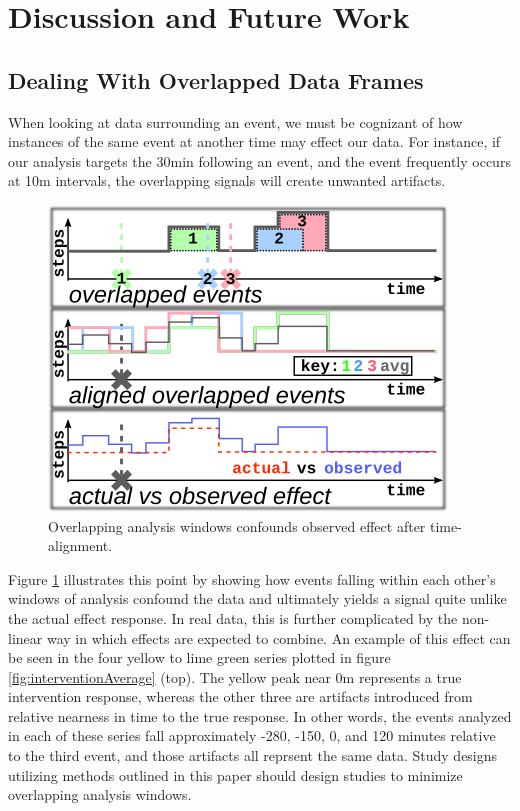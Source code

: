 \section{Discussion and Future Work}

\subsection{Dealing With Overlapped Data Frames}
When looking at data surrounding an event, we must be cognizant of how instances of the same event at another time may effect our data.
For instance, if our analysis targets the 30min following an event, and the event frequently occurs at 10m intervals, the overlapping signals will create unwanted artifacts.

\begin{figure}
\centering
\includegraphics[width=0.6\columnwidth]{./img/eventOverlapExample.png}
\caption{Overlapping analysis windows confounds observed effect after time-alignment.}
\label{fig:overlapExample}
\end{figure}

Figure \ref{fig:overlapExample} illustrates this point by showing how events falling within each other's windows of analysis confound the data and ultimately yields a signal quite unlike the actual effect response.
In real data, this is further complicated by the non-linear way in which effects are expected to combine.
An example of this effect can be seen in the four yellow to lime green series plotted in figure \ref{fig:interventionAverage} (top).
The yellow peak near 0m represents a true intervention response, whereas the other three are artifacts introduced from relative nearness in time to the true response.
In other words, the events analyzed in each of these series fall approximately -280, -150, 0, and 120 minutes relative to the third event, and those artifacts all reprsent the same data.
Study designs utilizing methods outlined in this paper should design studies to minimize overlapping analysis windows.

